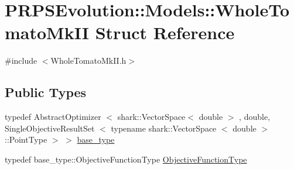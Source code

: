 \hypertarget{struct_p_r_p_s_evolution_1_1_models_1_1_whole_tomato_mk_i_i}{\section{\-P\-R\-P\-S\-Evolution\-:\-:\-Models\-:\-:\-Whole\-Tomato\-Mk\-I\-I \-Struct \-Reference}
\label{struct_p_r_p_s_evolution_1_1_models_1_1_whole_tomato_mk_i_i}
}


{\ttfamily \#include $<$\-Whole\-Tomato\-Mk\-I\-I.\-h$>$}

\subsection*{\-Public \-Types}
\begin{DoxyCompactItemize}
\item 
typedef \-Abstract\-Optimizer\*
$<$ shark\-::\-Vector\-Space$<$ double $>$\*
, double, \*
\-Single\-Objective\-Result\-Set\*
$<$ typename shark\-::\-Vector\-Space\*
$<$ double $>$\-::\-Point\-Type $>$ $>$ \hyperlink{struct_p_r_p_s_evolution_1_1_models_1_1_whole_tomato_mk_i_i_aaf58d587c99a6c98c606c5c60b195a0f}{base\-\_\-type}
\item 
typedef \*
base\-\_\-type\-::\-Objective\-Function\-Type \hyperlink{struct_p_r_p_s_evolution_1_1_models_1_1_whole_tomato_mk_i_i_a6a309578c1c90c4602553162115ff124}{\-Objective\-Function\-Type}
\end{DoxyCompactItemize}
